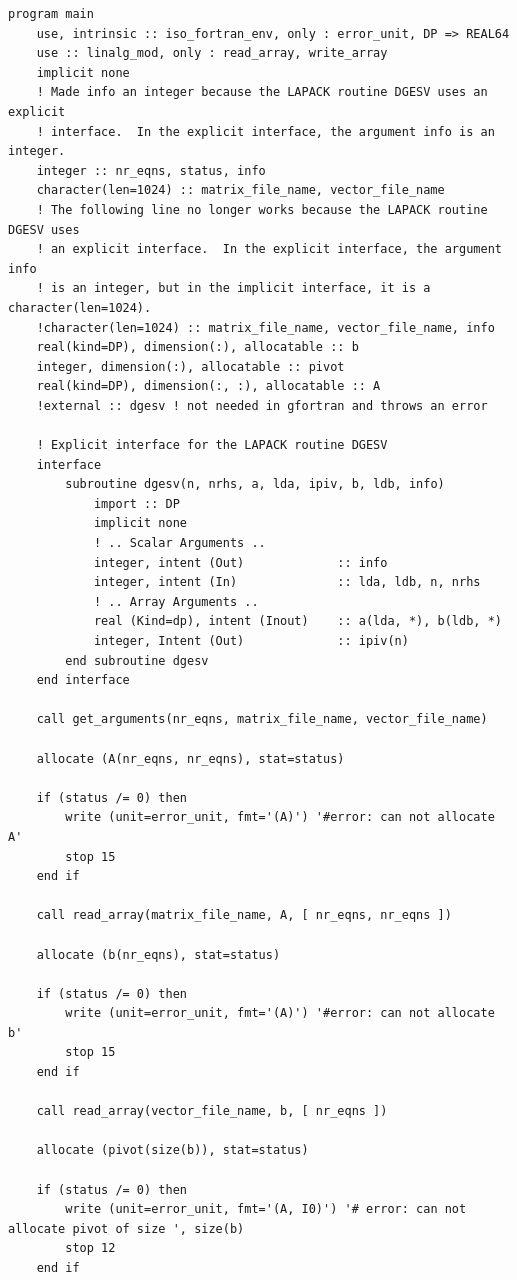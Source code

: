 \begin{verbatim}
program main
    use, intrinsic :: iso_fortran_env, only : error_unit, DP => REAL64
    use :: linalg_mod, only : read_array, write_array
    implicit none
    ! Made info an integer because the LAPACK routine DGESV uses an explicit
    ! interface.  In the explicit interface, the argument info is an integer.
    integer :: nr_eqns, status, info
    character(len=1024) :: matrix_file_name, vector_file_name
    ! The following line no longer works because the LAPACK routine DGESV uses
    ! an explicit interface.  In the explicit interface, the argument info
    ! is an integer, but in the implicit interface, it is a character(len=1024).
    !character(len=1024) :: matrix_file_name, vector_file_name, info
    real(kind=DP), dimension(:), allocatable :: b
    integer, dimension(:), allocatable :: pivot
    real(kind=DP), dimension(:, :), allocatable :: A
    !external :: dgesv ! not needed in gfortran and throws an error

    ! Explicit interface for the LAPACK routine DGESV
    interface
        subroutine dgesv(n, nrhs, a, lda, ipiv, b, ldb, info)
            import :: DP
            implicit none
            ! .. Scalar Arguments ..
            integer, intent (Out)             :: info
            integer, intent (In)              :: lda, ldb, n, nrhs
            ! .. Array Arguments ..
            real (Kind=dp), intent (Inout)    :: a(lda, *), b(ldb, *)
            integer, Intent (Out)             :: ipiv(n)
        end subroutine dgesv
    end interface

    call get_arguments(nr_eqns, matrix_file_name, vector_file_name)

    allocate (A(nr_eqns, nr_eqns), stat=status)

    if (status /= 0) then
        write (unit=error_unit, fmt='(A)') '#error: can not allocate A'
        stop 15
    end if

    call read_array(matrix_file_name, A, [ nr_eqns, nr_eqns ])

    allocate (b(nr_eqns), stat=status)

    if (status /= 0) then
        write (unit=error_unit, fmt='(A)') '#error: can not allocate b'
        stop 15
    end if

    call read_array(vector_file_name, b, [ nr_eqns ])

    allocate (pivot(size(b)), stat=status)

    if (status /= 0) then
        write (unit=error_unit, fmt='(A, I0)') '# error: can not allocate pivot of size ', size(b)
        stop 12
    end if


\end{verbatim}

